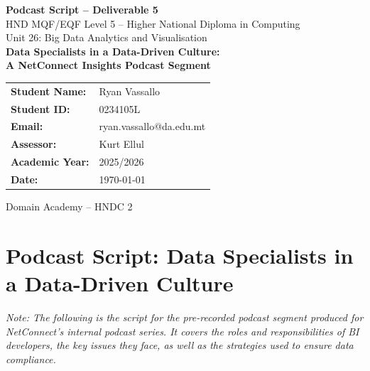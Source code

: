 \documentclass[12pt,a4paper]{article}
\begin{document}
\begin{titlepage}
    \centering
    \vspace*{1cm}

    {\Large \textbf{Podcast Script -- Deliverable 5}}\\[0.5cm]
    {\large HND MQF/EQF Level 5 -- Higher National Diploma in Computing}\\[0.3cm]
    {\large Unit 26: Big Data Analytics and Visualisation}\\[2cm]

    {\LARGE \textbf{Data Specialists in a Data-Driven Culture:\\[0.4cm]
    A NetConnect Insights Podcast Segment}}\\[2cm]

    \begin{tabular}{ll}
        \textbf{Student Name:}   & Ryan Vassallo              \\[0.3cm]
        \textbf{Student ID:}     & 0234105L                   \\[0.3cm]
        \textbf{Email:}          & ryan.vassallo@da.edu.mt    \\[0.3cm]
        \textbf{Assessor:}       & Kurt Ellul                 \\[0.3cm]
        \textbf{Academic Year:}  & 2025/2026                  \\[0.3cm]
        \textbf{Date:}           & \today                     \\
    \end{tabular}

    \vfill
    {\small Domain Academy -- HNDC 2}
\end{titlepage}

\newpage
\tableofcontents

\newpage
\section{Podcast Script: Data Specialists in a Data-Driven Culture}

\textit{Note: The following is the script for the pre-recorded podcast segment produced for NetConnect's internal podcast series. It covers the roles and responsibilities of BI developers, the key issues they face, as well as the strategies used to ensure data compliance.}
\end{document}
